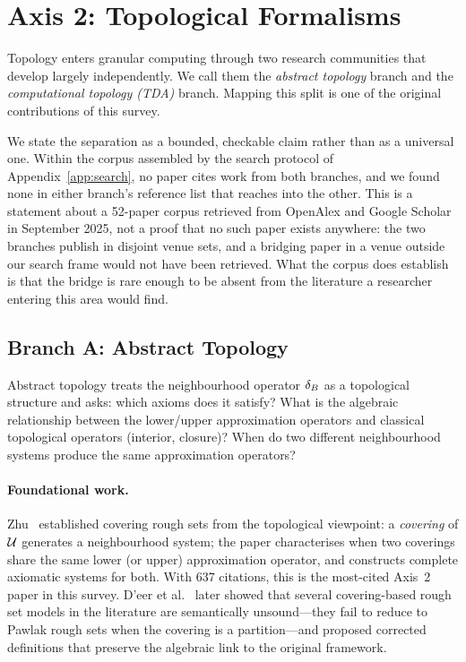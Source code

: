 \section{Axis 2: Topological Formalisms}
\label{sec:topology}

Topology enters granular computing through two research communities that
develop largely independently.  We call them the \emph{abstract topology}
branch and the \emph{computational topology (TDA)} branch.  Mapping this
split is one of the original contributions of this survey.

We state the separation as a bounded, checkable claim rather than as a
universal one.  Within the corpus assembled by the search protocol of
Appendix~\ref{app:search}, no paper cites work from both branches, and we
found none in either branch's reference list that reaches into the other.
This is a statement about a 52-paper corpus retrieved from OpenAlex and
Google Scholar in September 2025, not a proof that no such paper exists
anywhere: the two branches publish in disjoint venue sets, and a bridging
paper in a venue outside our search frame would not have been retrieved.
What the corpus does establish is that the bridge is rare enough to be
absent from the literature a researcher entering this area would find.

\subsection{Branch A: Abstract Topology}
\label{sec:abstract_topo}

Abstract topology treats the neighbourhood operator $\delta_{B}$ as a
topological structure and asks: which axioms does it satisfy?  What is the
algebraic relationship between the lower/upper approximation operators and
classical topological operators (interior, closure)?  When do two different
neighbourhood systems produce the same approximation operators?

\paragraph{Foundational work.}
Zhu~\cite{Zhu2007covering} established covering rough sets from the topological
viewpoint: a \emph{covering} of $\mathcal{U}$ generates a neighbourhood system; the
paper characterises when two coverings share the same lower (or upper)
approximation operator, and constructs complete axiomatic systems for both.
With 637 citations, this is the most-cited Axis~2 paper in this survey.
D'eer et al.~\cite{DeerCornelisYao2016} later showed that several
covering-based rough set models in the literature are semantically unsound---they
fail to reduce to Pawlak rough sets when the covering is a partition---and
proposed corrected definitions that preserve the algebraic link to the
original framework.

